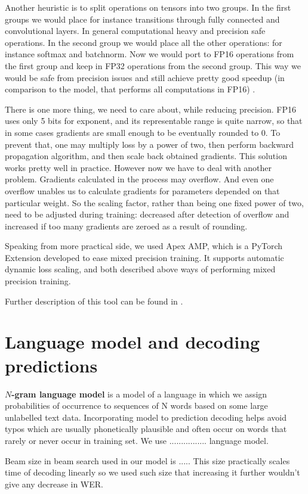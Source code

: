 \documentclass[licencjacka,en]{pracamgr}
\begin{document}
Another heuristic is to split operations on tensors into two groups. In the first groups we would place for instance transitions through fully connected and convolutional layers. In general computational heavy and precision safe operations. In the second group we would place all the other operations: for instance softmax and batchnorm. Now we would port to FP16 operations from the first group and keep in FP32 operations from the second group. This way we would be safe from precision issues and still achieve pretty good speedup (in comparison to the model, that performs all computations in FP16) \cite{APEX}.

There is one more thing, we need to care about, while reducing precision. FP16 uses only 5 bits for exponent, and its representable range is quite narrow, so that in some cases gradients are small enough to be eventually rounded to 0. To prevent that, one may multiply loss by a power of two, then perform backward propagation algorithm, and then scale back obtained gradients. This solution works pretty well in practice. However now we have to deal with another problem. Gradients calculated in the process may overflow. And even one overflow unables us to calculate gradients for parameters depended on that particular weight. So the scaling factor, rather than being one fixed power of two, need to be adjusted during training: decreased after detection of overflow and increased if too many gradients are zeroed as a result of rounding\cite{LOSS_SCALING}.

Speaking from more practical side, we used Apex AMP, which is a PyTorch Extension developed to ease mixed precision training. It supports automatic dynamic loss scaling, and both described above ways of performing mixed precision training.

Further description of this tool can be found in \cite{APEX_DOCS}.
\section{Language model and decoding predictions}
\textbf{$N$-gram language model} is a model of a language in which we assign probabilities of occurrence to sequences of N words based on some large unlabelled text data. Incorporating model to prediction decoding helps avoid typos which are usually phonetically plausible and often occur on words that rarely or never occur in training set. We use ................ language model.

Beam size in beam search used in our model is ..... This size practically scales time of decoding linearly so we used such size that increasing it further wouldn't give any decrease in WER.
\end{document}
